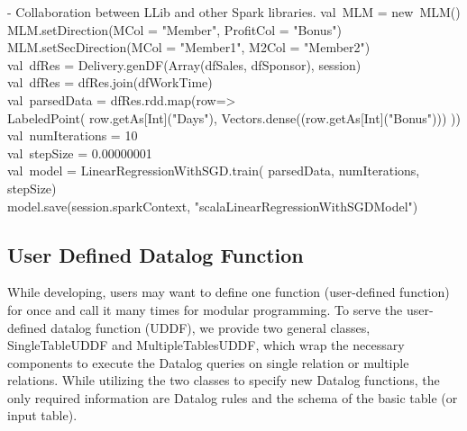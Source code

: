 \vspace{0.5em}
 - Collaboration between LLib and other Spark libraries.
\bldl
val\ MLM = new\ MLM()\\
MLM.setDirection(MCol = "Member", ProfitCol = "Bonus")\\
MLM.setSecDirection(MCol = "Member1", M2Col = "Member2") \\
val\ dfRes = Delivery.genDF(Array(dfSales, dfSponsor), session)\\
val\ dfRes = dfRes.join(dfWorkTime)\\ 
val\ parsedData = dfRes.rdd.map(row=>\\ LabeledPoint(
row.getAs[Int]("Days"),
Vectors.dense((row.getAs[Int]("Bonus")))
))\\
val\ numIterations = 10 \\
val\ stepSize = 0.00000001 \\

val\ model = LinearRegressionWithSGD.train(
parsedData,
numIterations,
stepSize)\\

model.save(session.sparkContext, "scalaLinearRegressionWithSGDModel")\\


\eldl




\subsection{User Defined Datalog Function}
While developing, users may want to define one function (user-defined function) for once and call it many times for modular programming. To serve the user-defined datalog function (UDDF), we provide two general classes, SingleTableUDDF and MultipleTablesUDDF, which wrap the necessary components to execute the Datalog queries on single relation or multiple relations.  %
While utilizing the two classes to specify new Datalog functions, the only required information are Datalog rules and the schema of the basic table (or input table). 

